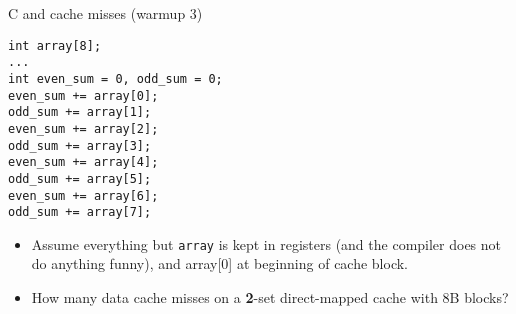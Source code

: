 \begin{frame}[fragile,label=arrayMissesWarmup3]{C and cache misses (warmup 3)}
\begin{lstlisting}[style=size10]
int array[8];
...
int even_sum = 0, odd_sum = 0;
even_sum += array[0];
odd_sum += array[1];
even_sum += array[2];
odd_sum += array[3];
even_sum += array[4];
odd_sum += array[5];
even_sum += array[6];
odd_sum += array[7];
\end{lstlisting}
\begin{itemize}
\item {\small
Assume everything but {\tt array} is kept in registers (and the compiler does not do
anything funny), and array[0] at beginning of cache block.}
\item How many data cache misses on a \textbf{2}-set direct-mapped cache with 8B blocks?
\end{itemize}
\end{frame}

